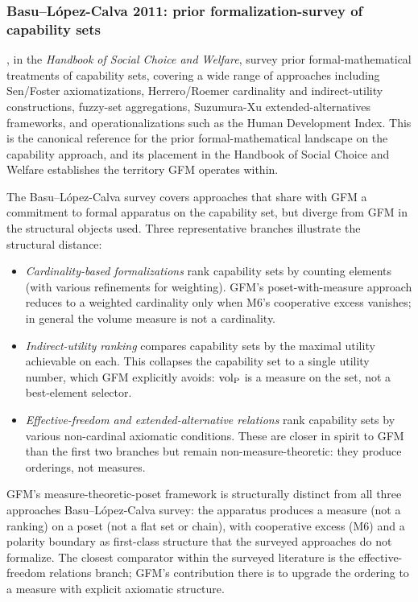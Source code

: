 \subsubsection{Basu--L\'opez-Calva 2011: prior formalization-survey of capability sets}

\citet{basu2011functionings}, in the \emph{Handbook of Social
Choice and Welfare}, survey prior formal-mathematical
treatments of capability sets, covering a wide range of
approaches including Sen/Foster axiomatizations, Herrero/Roemer
cardinality and indirect-utility constructions, fuzzy-set
aggregations, Suzumura-Xu extended-alternatives frameworks, and
operationalizations such as the Human Development Index.  This
is the canonical reference for the prior formal-mathematical
landscape on the capability approach, and its placement in the
Handbook of Social Choice and Welfare establishes the territory
GFM operates within.

The Basu--L\'opez-Calva survey covers approaches that share with
GFM a commitment to formal apparatus on the capability set, but
diverge from GFM in the structural objects used.  Three
representative branches illustrate the structural distance:
\begin{itemize}
\item \emph{Cardinality-based formalizations} rank capability
  sets by counting elements (with various refinements for
  weighting).  GFM's poset-with-measure approach reduces to a
  weighted cardinality only when M6's cooperative excess
  vanishes; in general the volume measure is not a
  cardinality.
\item \emph{Indirect-utility ranking} compares capability sets
  by the maximal utility achievable on each.  This collapses
  the capability set to a single utility number, which GFM
  explicitly avoids: ${\operatorname{vol}_{\mathrm{P}}}$ is a measure on the set, not a
  best-element selector.
\item \emph{Effective-freedom and extended-alternative
  relations} rank capability sets by various non-cardinal
  axiomatic conditions.  These are closer in spirit to GFM
  than the first two branches but remain non-measure-theoretic:
  they produce orderings, not measures.
\end{itemize}
GFM's measure-theoretic-poset framework is structurally
distinct from all three approaches Basu--L\'opez-Calva survey:
the apparatus produces a measure (not a ranking) on a poset
(not a flat set or chain), with cooperative excess (M6) and a
polarity boundary as first-class structure that the surveyed
approaches do not formalize.  The closest comparator within the
surveyed literature is the effective-freedom relations branch;
GFM's contribution there is to upgrade the ordering to a
measure with explicit axiomatic structure.

